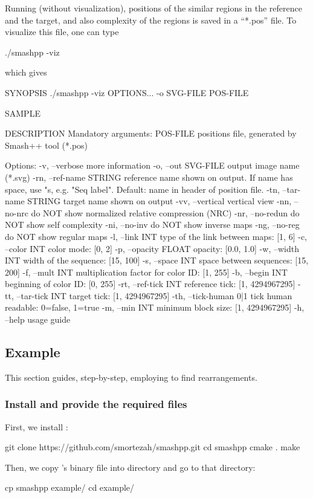 Running \smashpp (without visualization), positions of the similar regions in the reference and the target, and also complexity of the regions is saved in a ``*.pos'' file. To visualize this file, one can type
\begin{code}[style=bash]
./smashpp -viz
\end{code}
which gives
\begin{code}[style=bash]
SYNOPSIS
  ./smashpp -viz  OPTIONS...  -o SVG-FILE  POS-FILE

SAMPLE

DESCRIPTION
  Mandatory arguments:
  POS-FILE                 positions file, generated by
                           Smash++ tool (*.pos)

  Options:
  -v,  --verbose           more information
  -o,  --out SVG-FILE      output image name (*.svg)
  -rn, --ref-name STRING   reference name shown on output. If name
                           has space, use "s, e.g. "Seq label".
                           Default: name in header of position file.
  -tn, --tar-name STRING   target name shown on output
  -vv, --vertical          vertical view
  -nn, --no-nrc            do NOT show normalized
                           relative compression (NRC)
  -nr, --no-redun          do NOT show self complexity
  -ni, --no-inv            do NOT show inverse maps
  -ng, --no-reg            do NOT show regular maps
  -l,  --link     INT      type of the link between maps: [1, 6]
  -c,  --color    INT      color mode: [0, 2]
  -p,  --opacity  FLOAT    opacity: [0.0, 1.0]
  -w,  --width    INT      width of the sequence: [15, 100]
  -s,  --space    INT      space between sequences: [15, 200]
  -f,  --mult     INT      multiplication factor for
                           color ID: [1, 255]
  -b,  --begin    INT      beginning of color ID: [0, 255]
  -rt, --ref-tick INT      reference tick: [1, 4294967295]
  -tt, --tar-tick INT      target tick: [1, 4294967295]
  -th, --tick-human 0|1    tick human readable: 0=false, 1=true
  -m,  --min      INT      minimum block size: [1, 4294967295]
  -h,  --help              usage guide
\end{code}

\subsection{Example}
This section guides, step-by-step, employing \smashpp to find rearrangements.

\subsubsection*{Install \smashpp and provide the required files}
First, we install \smashpp:
\begin{code}[style=bash]
git clone https://github.com/smortezah/smashpp.git
cd smashpp
cmake .
make
\end{code}
Then, we copy \smashpp's binary file into  directory and go to that directory:
\begin{code}[style=bash]
cp smashpp example/
cd example/
\end{code}